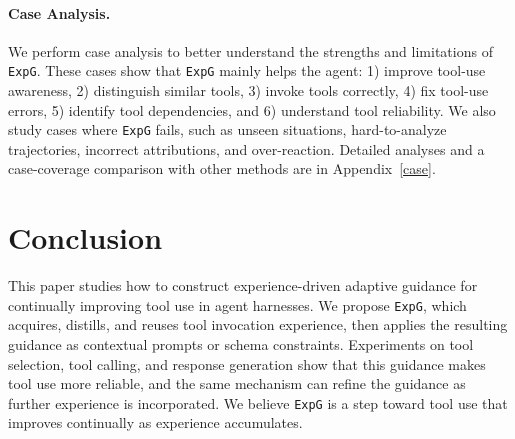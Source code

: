 \documentclass[11pt]{article}
\newcommand{\ours}{\texttt{ExpG}}
\begin{document}

\vspace{-1mm}
\paragraph{Case Analysis.} We perform case analysis to better understand the strengths and limitations of {\ours}. These cases show that {\ours} mainly helps the agent: 1) improve tool-use awareness, 2) distinguish similar tools, 3) invoke tools correctly, 4) fix tool-use errors, 5) identify tool dependencies, and 6) understand tool reliability. We also study cases where {\ours} fails, such as unseen situations, hard-to-analyze trajectories, incorrect attributions, and over-reaction. Detailed analyses and a case-coverage comparison with other methods are in Appendix~\ref{case}.

\section{Conclusion}
\vspace{-1mm}
This paper studies how to construct experience-driven adaptive guidance for continually improving tool use in agent harnesses. We propose {\ours}, which acquires, distills, and reuses tool invocation experience, then applies the resulting guidance as contextual prompts or schema constraints. Experiments on tool selection, tool calling, and response generation show that this guidance makes tool use more reliable, and the same mechanism can refine the guidance as further experience is incorporated. We believe {\ours} is a step toward tool use that improves continually as experience accumulates.
\end{document}
